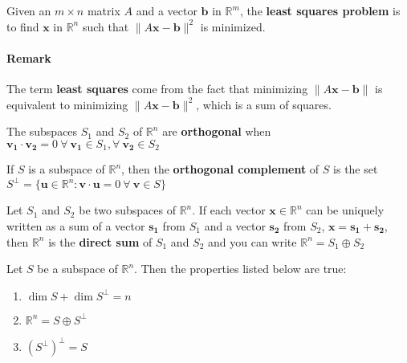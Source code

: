 \documentclass{report}
\begin{document}
\begin{tcolorbox}[title = Least Squares Problem]
		Given an $m \times n$ matrix $A$ and a vector $\bm{b}$ in $\mathbb{R}^m$, the \textbf{least squares problem} is to find $\bm{x}$ in $\mathbb{R}^n$ such that $\| A\bm{x} - \bm{b} \| ^2$ is minimized.
		
		\paragraph{Remark} The term \textbf{least squares} come from the fact that minimizing $\| A\bm{x} - \bm{b} \| $ is equivalent to minimizing $\| A\bm{x} - \bm{b} \| ^ 2$, which is a sum of squares.
\end{tcolorbox}

\begin{tcolorbox}[title = Definition of Orthogonal Subspaces]
		The subspaces $S_1$ and $S_2$ of $\mathbb{R}^n$ are \textbf{orthogonal} when $\bm{v_1} \cdot \bm{v_2} = 0 \ \forall \  \bm{v_1} \in S_1, \forall \ 	\bm{v_2} \in S_2$
\end{tcolorbox}

\begin{tcolorbox}[title = Orthogonal Complement]
	If $S$ is a subspace of $\mathbb{R}^n$, then the \textbf{orthogonal complement} of $S$ is the set $S^\perp = \{ \bm{u} \in \mathbb{R}^n: \bm{v} \cdot \bm{u} = 0 \ \forall \  \bm{v} \in S\}$
\end{tcolorbox}

\begin{tcolorbox}[title = Definition of Direct Sum]
	Let $S_1$ and $S_2$ be two subspaces of $\mathbb{R}^n$. If each vector $\bm{x} \in \mathbb{R}^n$ can be uniquely written as a sum of a vector $\bm{s_1}$ from $S_1$ and a vector $\bm{s_2}$ from $S_2$, $\bm{x} = \bm{s_1} + \bm{s_2}$, then $\mathbb{R}^n$ is the \textbf{direct sum} of $S_1$ and $S_2$ and you can write $\mathbb{R}^n = S_1 \oplus S_2$
\end{tcolorbox}

\begin{tcolorbox}[title = Properties of Orthogonal Subspaces]
	Let $S$ be a subspace of $\mathbb{R}^n$. Then the properties listed below are true:
	
	\begin{enumerate}
		\item $\dim{S} + \dim{S^\perp} = n$
		\item $\mathbb{R}^n = S \oplus S^\perp$
		\item $\left( S^\perp \right)^\perp = S$
	\end{enumerate}
\end{tcolorbox}
\end{document}
